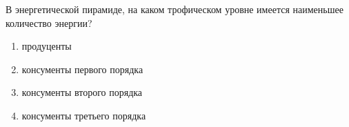 
В
энергетической пирамиде, на каком трофическом уровне имеется наименьшее
количество энергии?

\begin{enumerate}
    \item продуценты 
    \item консументы первого порядка  
    \item консументы второго порядка 
    \item консументы третьего порядка
\end{enumerate}

